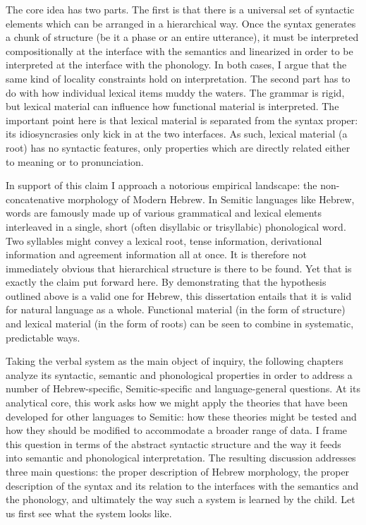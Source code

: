 The core idea has two parts. The first is that there is a universal set of syntactic elements which can be arranged in a hierarchical way. Once the syntax generates a chunk of structure (be it a phase or an entire utterance), it must be interpreted compositionally at the interface with the semantics and linearized in order to be interpreted at the interface with the phonology. In both cases, I argue that the same kind of locality constraints hold on interpretation. The second part has to do with how individual lexical items muddy the waters. The grammar is rigid, but lexical material can influence how functional material is interpreted. The important point here is that lexical material is separated from the syntax proper: its idiosyncrasies only kick in at the two interfaces. As such, lexical material (a root) has no syntactic features, only properties which are directly related either to meaning or to pronunciation.

In support of this claim I approach a notorious empirical landscape: the non-concatenative morphology of Modern Hebrew. In Semitic languages like Hebrew, words are famously made up of various grammatical and lexical elements interleaved in a single, short (often disyllabic or trisyllabic) phonological word. Two syllables might convey a lexical root, tense information, derivational information and agreement information all at once. It is therefore not immediately obvious that hierarchical structure is there to be found. Yet that is exactly the claim put forward here. By demonstrating that the hypothesis outlined above is a valid one for Hebrew, this dissertation entails that it is valid for natural language as a whole. Functional material (in the form of structure) and lexical material (in the form of roots) can be seen to combine in systematic, predictable ways.

Taking the verbal system as the main object of inquiry, the following chapters analyze its syntactic, semantic and phonological properties in order to address a number of Hebrew-specific, Semitic-specific and language-general questions. At its analytical core, this work asks how we might apply the theories that have been developed for other languages to Semitic: how these theories might be tested and how they should be modified to accommodate a broader range of data. I frame this question in terms of the abstract syntactic structure and the way it feeds into semantic and phonological interpretation. The resulting discussion addresses three main questions: the proper description of Hebrew morphology, the proper description of the syntax and its relation to the interfaces with the semantics and the phonology, and ultimately the way such a system is learned by the child. Let us first see what the system looks like.



